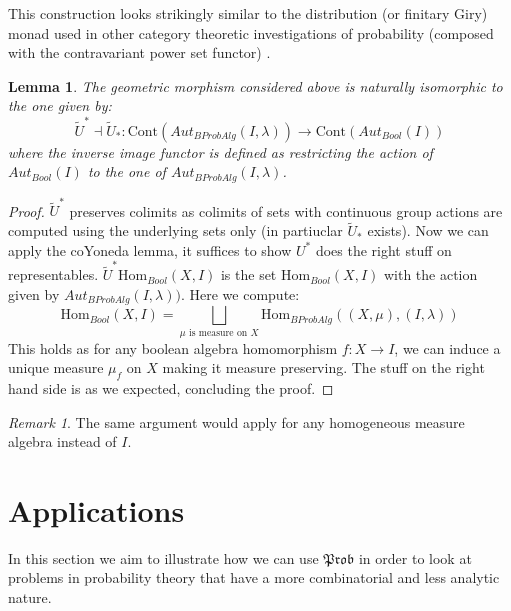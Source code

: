 \documentclass[a4paper]{amsproc}
\theoremstyle{plain}
\newtheorem{lemma}[theorem]{Lemma}
\theoremstyle{definition}
\theoremstyle{remark}
\newtheorem{remark}[theorem]{Remark}
\numberwithin{equation}{section}
\begin{document}
This construction looks strikingly similar to the distribution (or finitary Giry) monad used in other category theoretic investigations of probability (composed with the contravariant power set functor) .
\begin{lemma} The geometric morphism considered above is naturally isomorphic to the one given by:
\[\tilde{U}^*\dashv \tilde{U}_*:\text{Cont}(Aut_{BProbAlg}(I,\lambda))\rightarrow\text{Cont}(Aut_{Bool}(I))\]
where the inverse image functor is defined as restricting the action of $Aut_{Bool}(I)$ to the one of $Aut_{BProbAlg}(I,\lambda)$.
\end{lemma}
\begin{proof} 
$\tilde{U}^*$ preserves colimits as colimits of sets with continuous group actions are computed using the underlying sets only (in partiuclar $\tilde{U}_*$ exists).
Now we can apply the coYoneda lemma, it suffices to show $U^*$ does the right stuff on representables.
  $\tilde{U}^*\text{Hom}_{Bool}(X,I)$ is the set 
$\text{Hom}_{Bool}(X,I)$ with the action given by $Aut_{BProbAlg}(I,\lambda))$. Here we compute:
\[\text{Hom}_{Bool}(X,I)=\bigsqcup_{\mu\text{ is measure on }X}\text{Hom}_{BProbAlg}((X,\mu),(I,\lambda))\]
This holds as for any boolean algebra homomorphism $f:X\rightarrow I$, we can induce a unique measure $\mu_f$ on $X$ making it measure preserving. The stuff on the right hand side is as we expected, concluding the proof.
\end{proof}
\begin{remark} The same argument would apply for any homogeneous measure algebra instead of $I$.
\end{remark}



\section{Applications} \label{applications}

In this section we aim to illustrate how we can use $\mathfrak{Prob}$ in order to look at problems in probability theory that have a more combinatorial and less analytic nature. 
\end{document}
